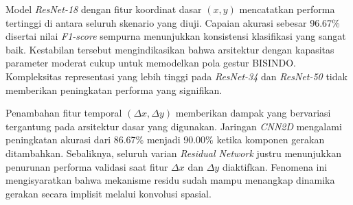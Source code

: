 \begin{table}[H]
  \centering
  \caption{Hasil evaluasi performa seluruh skenario baseline pada data validasi}
  \label{tab:hasil-baseline}
\end{table}

Model \textit{ResNet-18} dengan fitur koordinat dasar $(x, y)$ mencatatkan performa tertinggi di antara seluruh skenario yang diuji.
Capaian akurasi sebesar 96.67\% disertai nilai \textit{F1-score} sempurna menunjukkan konsistensi klasifikasi yang sangat baik.
Kestabilan tersebut mengindikasikan bahwa arsitektur dengan kapasitas parameter moderat cukup untuk memodelkan pola gestur BISINDO.
Kompleksitas representasi yang lebih tinggi pada \textit{ResNet-34} dan \textit{ResNet-50} tidak memberikan peningkatan performa yang signifikan.

Penambahan fitur temporal $(\Delta x, \Delta y)$ memberikan dampak yang bervariasi tergantung pada arsitektur dasar yang digunakan.
Jaringan \textit{CNN2D} mengalami peningkatan akurasi dari 86.67\% menjadi 90.00\% ketika komponen gerakan ditambahkan.
Sebaliknya, seluruh varian \textit{Residual Network} justru menunjukkan penurunan performa validasi saat fitur $\Delta x$ dan $\Delta y$ diaktifkan.
Fenomena ini mengisyaratkan bahwa mekanisme residu sudah mampu menangkap dinamika gerakan secara implisit melalui konvolusi spasial.

